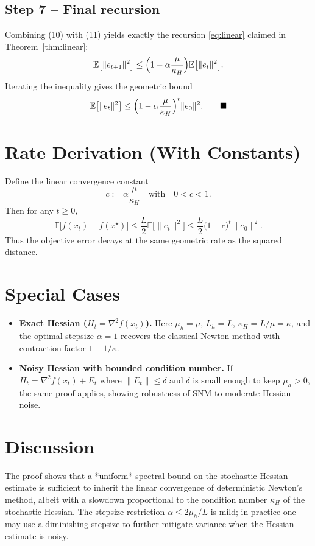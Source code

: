\documentclass{article}
\newcommand{\E}{\mathbb{E}}
\begin{document}
\subsection*{Step 7 – Final recursion}
Combining (10) with (11) yields exactly the recursion \eqref{eq:linear} claimed in Theorem~\ref{thm:linear}:
\[
\E\bigl[\|e_{t+1}\|^{2}\bigr]\le\Bigl(1-\alpha\frac{\mu}{\kappa_{H}}\Bigr)\E\bigl[\|e_{t}\|^{2}\bigr].
\]
Iterating the inequality gives the geometric bound
\[
\E\bigl[\|e_{t}\|^{2}\bigr]\le\Bigl(1-\alpha\frac{\mu}{\kappa_{H}}\Bigr)^{t}\|e_{0}\|^{2}.
\qquad\blacksquare
\]

\section*{Rate Derivation (With Constants)}
Define the linear convergence constant
\[
c:=\alpha\frac{\mu}{\kappa_{H}}
\quad\text{with}\quad
0<c<1.
\]
Then for any $t\ge0$,
\[
\E\!\bigl[f(x_{t})-f(x^{\star})\bigr]
\le \frac{L}{2}\E\!\bigl[\|e_{t}\|^{2}\bigr]
\le \frac{L}{2}\bigl(1-c\bigr)^{t}\|e_{0}\|^{2}.
\]
Thus the objective error decays at the same geometric rate as the squared distance.

\section*{Special Cases}
\begin{itemize}
\item \textbf{Exact Hessian ($H_{t}=\nabla^{2}f(x_{t})$).} Here $\mu_{h}=\mu$, $L_{h}=L$, $\kappa_{H}=L/\mu=\kappa$, and the optimal stepsize $\alpha=1$ recovers the classical Newton method with contraction factor $1-1/\kappa$.
\item \textbf{Noisy Hessian with bounded condition number.} If $H_{t}=\nabla^{2}f(x_{t})+E_{t}$ where $\|E_{t}\|\le \delta$ and $\delta$ is small enough to keep $\mu_{h}>0$, the same proof applies, showing robustness of SNM to moderate Hessian noise.
\end{itemize}

\section*{Discussion}
The proof shows that a *uniform* spectral bound on the stochastic Hessian estimate is sufficient to inherit the linear convergence of deterministic Newton’s method, albeit with a slowdown proportional to the condition number $\kappa_{H}$ of the stochastic Hessian. The stepsize restriction $\alpha\le 2\mu_{h}/L$ is mild; in practice one may use a diminishing stepsize to further mitigate variance when the Hessian estimate is noisy.
\end{document}
